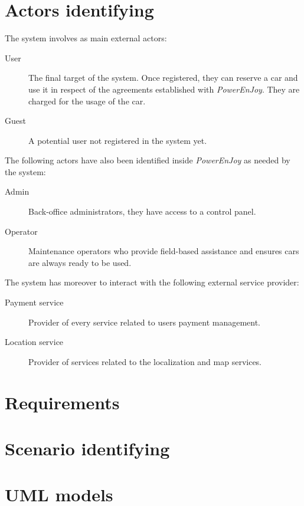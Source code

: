 \documentclass[12pt, a4paper]{article}
\begin{document}
	\section{Actors identifying}
		The system involves as main external actors:
		\begin{description}
			\item[User] The final target of the system. Once registered, they can reserve a car and use it in respect of the agreements established with \textit{PowerEnJoy}. They are charged for the usage of the car.

			\item[Guest] A potential user not registered in the system yet.
		\end{description}
		The following actors have also been identified inside \textit{PowerEnJoy} as needed by the system:
		\begin{description}
			\item[Admin] Back-office administrators, they have access to a control panel.

			\item[Operator] Maintenance operators who provide field-based assistance and ensures cars are always ready to be used.

		\end{description}
		The system has moreover to interact with the following external service provider:
		\begin{description}
			\item[Payment service] Provider of every service related to users payment management.
			\item[Location service] Provider of services related to the localization and map services.
		\end{description}

	\newpage
	\section{Requirements}
	

	\newpage
	\section{Scenario identifying}
	
		

	\newpage
	\section{UML models}
	
\end{document}
